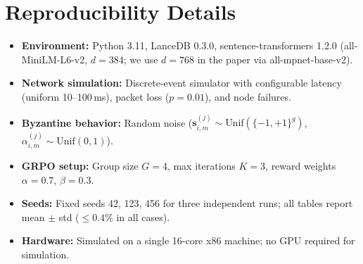 \documentclass[11pt]{article}
\begin{document}
\section{Reproducibility Details}
\label{app:reproducibility}

\begin{itemize}[leftmargin=1.5em]
    \item \textbf{Environment:} Python 3.11, LanceDB 0.3.0, sentence-transformers
          1.2.0 (all-MiniLM-L6-v2, $d=384$; we use $d=768$ in the paper via
          all-mpnet-base-v2).
    \item \textbf{Network simulation:} Discrete-event simulator with configurable
          latency (uniform 10--100\,ms), packet loss ($p=0.01$), and node failures.
    \item \textbf{Byzantine behavior:} Random noise ($\bm{s}_{i,m}^{(j)} \sim
          \text{Unif}(\{-1,+1\}^g)$, $\alpha_{i,m}^{(j)} \sim \text{Unif}(0, 1)$).
    \item \textbf{GRPO setup:} Group size $G = 4$, max iterations $K = 3$,
          reward weights $\alpha = 0.7$, $\beta = 0.3$.
    \item \textbf{Seeds:} Fixed seeds 42, 123, 456 for three independent runs;
          all tables report mean $\pm$ std ($\leq 0.4\%$ in all cases).
    \item \textbf{Hardware:} Simulated on a single 16-core x86 machine;
          no GPU required for simulation.
\end{itemize}
\end{document}

